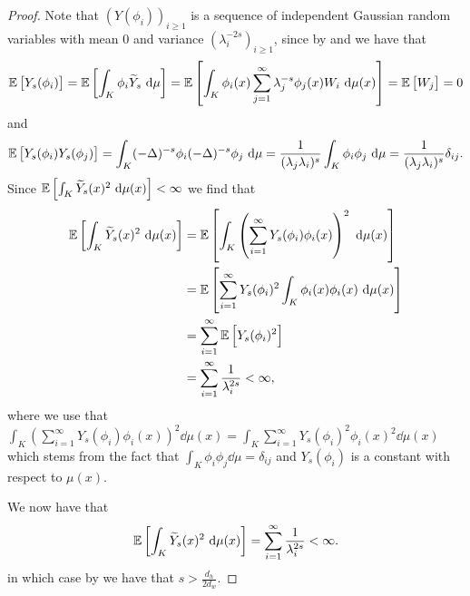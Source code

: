 \begin{proof}
	Note that $\left(Y(\phi_i)\right)_{i \geq 1}$ is a sequence of independent Gaussian random variables with mean 0 and variance $(\lambda_{i}^{-2s})_{i \geq 1}$, since by  and  we have that
	\begin{equation}
		\e \left[Y_s(\phi_i)\right] =\e \left[\int_{K} \phi_i \widetilde{Y}_s \dd \mu \right] = \e \left[\int_{K} \phi_i(x) \sum_{j = 1}^{\infty} \lambda_j^{-s}\phi_j(x)W_i \dd \mu(x) \right]= \e \left[W_j\right] =0
	\end{equation}
	and
	\begin{equation}
		\mathbb{E} \left[Y_s(\phi_i)Y_s(\phi_j)\right] = \int_{K}  (-\Delta)^{-s}\phi_i (-\Delta)^{-s}\phi_j \ \text{d} \mu = \frac{1}{(\lambda_{j}\lambda_i)^{s}} \int_{K} \phi_i \phi_j \ \text{d} \mu = \frac{1}{(\lambda_{j}\lambda_i)^{s}} \delta_{ij}.
	\end{equation}
	Since $\mathbb{E} \left[\int_{K} \widetilde{Y}_{s}(x)^2 \ \text{d} \mu (x)\right] < \infty$  we find that
	\begin{align}
		\e \left[\int_{K} \widetilde{Y}_{s}(x)^2 \dd \mu (x)\right]  &= \e \left[\int_{K} \left(\sum_{i = 1}^{\infty} Y_s(\phi_i)\phi_i(x)\right)^{2}\dd\mu(x)\right] \\
		& = \e \left[\sum_{i = 1}^{\infty} Y_s(\phi_i)^2\int_{K} \phi_i(x)\phi_i(x) \dd \mu (x) \right] \\
		& = \sum_{i = 1}^{\infty}\e \left[Y_s(\phi_i)^2\right] \\
		& = \sum_{i = 1}^{\infty} \frac{1}{\lambda_i^{2s}} < \infty,
	\end{align}
	where we use that $\int_{K} \left(\sum_{i = 1}^{\infty} Y_s(\phi_i)\phi_i(x) \right)^2 \dd \mu(x) = \int_{K} \sum_{i = 1}^{\infty} Y_s(\phi_i)^2 \phi_i(x)^2 \dd \mu (x)$ which stems from the fact that $\int_{K}\phi_i \phi_j \dd \mu = \delta_{ij}$ and $Y_s(\phi_i)$ is a constant with respect to $\mu(x)$.
	
	We now have that
	\begin{equation}
		\e \left[\int_{K} \widetilde{Y}_{s}(x)^2 \dd \mu (x)\right] = \sum_{i = 1}^{\infty} \frac{1}{\lambda_i^{2s}} < \infty.
	\end{equation}
	in which case by  we have that $s > \frac{d_h}{2d_w}$.
\end{proof}